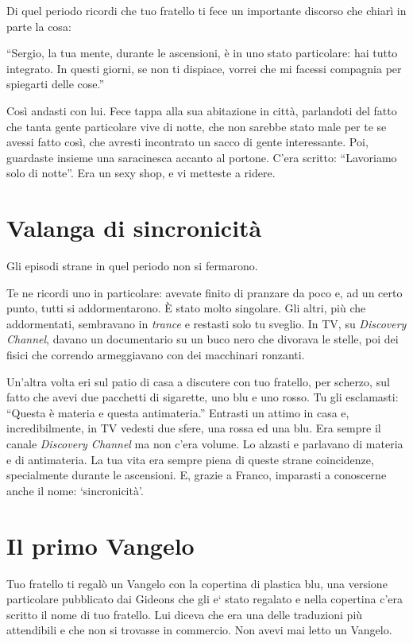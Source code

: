 Di quel periodo ricordi che tuo fratello ti fece un importante discorso che chiarì in parte la cosa:

“Sergio, la tua mente, durante le ascensioni, è in uno stato particolare: hai tutto integrato. In questi giorni, se non ti dispiace, vorrei che mi facessi compagnia per spiegarti delle cose.”

Così andasti con lui. Fece tappa alla sua abitazione in città, parlandoti del fatto che tanta gente particolare vive di notte, che non sarebbe stato male per te se avessi fatto così, che avresti incontrato un sacco di gente interessante. Poi, guardaste insieme una saracinesca accanto al portone. C'era scritto: “Lavoriamo solo di notte”. Era un sexy shop, e vi metteste a ridere.

\section{Valanga di sincronicità}
\label{valanga_di_sincronicità}

Gli episodi strane in quel periodo non si fermarono.

Te ne ricordi uno in particolare: avevate finito di pranzare da poco e, ad un certo punto, tutti si addormentarono. È stato molto singolare. Gli altri, più che addormentati, sembravano in \textit{trance} e restasti solo tu sveglio. In TV, su \textit{Discovery Channel}, davano un documentario su un buco nero che divorava le stelle, poi dei fisici che correndo armeggiavano con dei macchinari ronzanti.

Un'altra volta eri sul patio di casa a discutere con tuo fratello, per scherzo, sul fatto che avevi due pacchetti di sigarette, uno blu e uno rosso. Tu gli esclamasti: “Questa è materia e questa antimateria.” Entrasti un attimo in casa e, incredibilmente, in TV vedesti due sfere, una rossa ed una blu. Era sempre il canale \textit{Discovery Channel} ma non c'era volume. Lo alzasti e parlavano di materia e di antimateria. La tua vita era sempre piena di queste strane coincidenze, specialmente durante le ascensioni. E, grazie a Franco, imparasti a conoscerne anche il nome: ‘sincronicità’.

\section{Il primo Vangelo}
\label{vangelo}

Tuo fratello ti regalò un Vangelo con la copertina di plastica blu, una versione particolare pubblicato dai Gideons che gli e` stato regalato e nella copertina c'era scritto il nome di tuo fratello. Lui diceva che era una delle traduzioni più attendibili e che non si trovasse in commercio. Non avevi mai letto un Vangelo.

